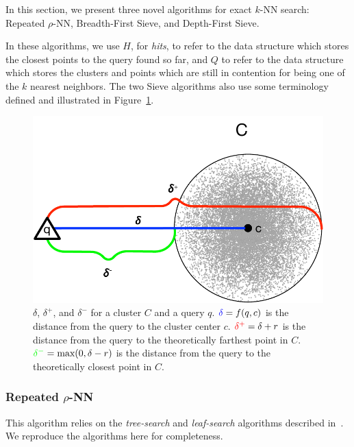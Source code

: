 In this section, we present three novel algorithms for exact $k$-NN search:
Repeated $\rho$-NN, Breadth-First Sieve, and Depth-First Sieve.

In these algorithms, we use $H$, for \textit{hits}, to refer to the data structure which stores the closest points to the query found so far, and $Q$ to refer to the data structure which stores the clusters and points which are still in contention for being one of the $k$ nearest neighbors.
The two Sieve algorithms also use some terminology defined and illustrated in Figure~\ref{fig:methods:deltas}.

\begin{figure}
    \centering
    \includegraphics[scale=0.65]{images/geometry/deltas.pdf}
    \caption{
        {\color{blue}$\delta$}, {\color{red}$\delta^{+}$}, and {\color{green}$\delta^{-}$} for a cluster $C$ and a query $q$.
        ${\color{blue}\delta} = f(q, c)$ is the distance from the query to the cluster center $c$.
        ${\color{red}\delta^{+}} = \delta + r$ is the distance from the query to the theoretically farthest point in $C$.
        ${\color{green}\delta^{-}} = \text{max}(0, \delta - r)$ is the distance from the query to the theoretically closest point in $C$.
    }
    \label{fig:methods:deltas}
\end{figure}%


\subsubsection{Repeated \texorpdfstring{$\rho$}{p}-NN}
\label{sec:methods:knn-search:repeated-rnn}

This algorithm relies on the \textit{tree-search} and \textit{leaf-search} algorithms described in~\cite{ishaq2019clustered}.
We reproduce the algorithms here for completeness.


